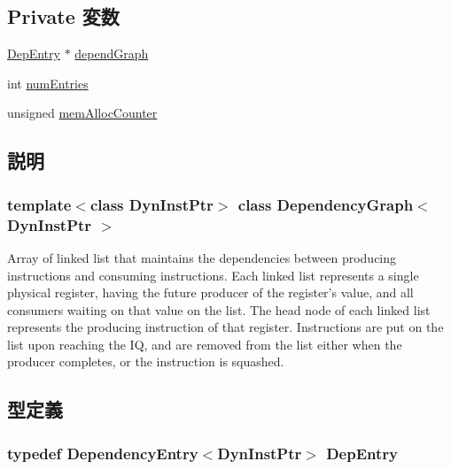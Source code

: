 \subsection*{Private 変数}
\begin{DoxyCompactItemize}
\item 
\hyperlink{classDependencyEntry}{DepEntry} $\ast$ \hyperlink{classDependencyGraph_a6f79afe06f613dc0de42e79175c6e776}{dependGraph}
\item 
int \hyperlink{classDependencyGraph_a75b15f0e26b4ccf3195772b134b660ec}{numEntries}
\item 
unsigned \hyperlink{classDependencyGraph_a3cfe22df7cc4db63a7704ae43ef789aa}{memAllocCounter}
\end{DoxyCompactItemize}


\subsection{説明}
\subsubsection*{template$<$class DynInstPtr$>$ class DependencyGraph$<$ DynInstPtr $>$}

Array of linked list that maintains the dependencies between producing instructions and consuming instructions. Each linked list represents a single physical register, having the future producer of the register's value, and all consumers waiting on that value on the list. The head node of each linked list represents the producing instruction of that register. Instructions are put on the list upon reaching the IQ, and are removed from the list either when the producer completes, or the instruction is squashed. 

\subsection{型定義}
\hypertarget{classDependencyGraph_ab740e4c6c7a7c521e28f61fc991417f8}{
\subsubsection[{DepEntry}]{\setlength{\rightskip}{0pt plus 5cm}typedef {\bf DependencyEntry}$<$DynInstPtr$>$ {\bf DepEntry}}}
\label{classDependencyGraph_ab740e4c6c7a7c521e28f61fc991417f8}


